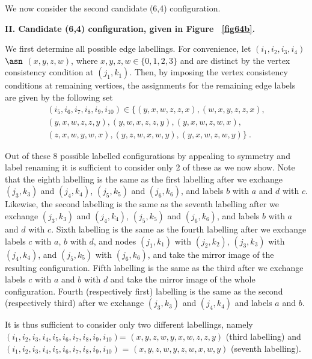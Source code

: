 
We now consider the second candidate (6,4) configuration.

\textbf{II. Candidate (6,4) configuration, given in Figure
~\ref{fig64b}.}

We first determine all possible edge labellings. For convenience,
let $(i_1,i_2,i_3,i_4)$ $\asn$ $(x,y,z,w)$, where $x,y,z,w \in
\{0,1,2,3 \}$ and are distinct by the vertex consistency condition
at $(j_1,k_1)$. Then, by imposing the vertex consistency
conditions at remaining vertices, the assignments for the
remaining edge labels are given by the following set
\begin{equation}\label{tuples2}\begin{array}{cccc} (i_5,i_6,i_7,i_8,i_9,i_{10}) \in
 \{(y,x,w,z,z,x),(w,x,y,z,z,x),\\
 (y,x,w,z,z,y),(y,w,x,z,z,y),(y,x,w,z,w,x),\\(z,x,w,y,w,x),(y,z,w,x,w,y),(y,x,w,z,w,y)\}~.
\end{array}\end{equation}

Out of these 8 possible labelled configurations by appealing to
symmetry and label renaming it is sufficient to consider only 2 of
these as we now show. Note that the eighth labelling is the same
as the first labelling after we exchange $(j_3,k_3)$ and
$(j_4,k_4)$, $(j_5,k_5)$ and $(j_6,k_6)$, and labels $b$ with $a$
and $d$ with $c$. Likewise, the second labelling is the same as
the seventh labelling after we exchange $(j_3,k_3)$ and
$(j_4,k_4)$, $(j_5,k_5)$ and $(j_6,k_6)$, and labels $b$ with $a$
and $d$ with $c$. Sixth labelling is the same as the fourth
labelling after we exchange labels $c$ with $a$, $b$ with $d$, and
nodes $(j_1,k_1)$ with $(j_2,k_2)$, $(j_3,k_3)$ with $(j_4,k_4)$,
and $(j_5,k_5)$ with $(j_6,k_6)$, and take the mirror image of the
resulting configuration. Fifth labelling is the same as the third
after we exchange labels $c$ with $a$ and $b$ with $d$ and take
the mirror image of the whole configuration. Fourth (respectively
first) labelling is the same as the second (respectively third)
after we exchange $(j_3,k_3)$ and $(j_4,k_4)$ and labels $a$ and
$b$.

It is thus sufficient to consider only two different labellings,
namely $(i_1,i_2,i_3,i_4,i_5,i_6,i_7,i_8,i_9,i_{10})$=
$(x,y,z,w,y,x,w,z,z,y)$ (third labelling) and
$(i_1,i_2,i_3,i_4,i_5,i_6,i_7,i_8,i_9,i_{10})$ =
$(x,y,z,w,y,z,w,x,w,y)$ (seventh labelling).

